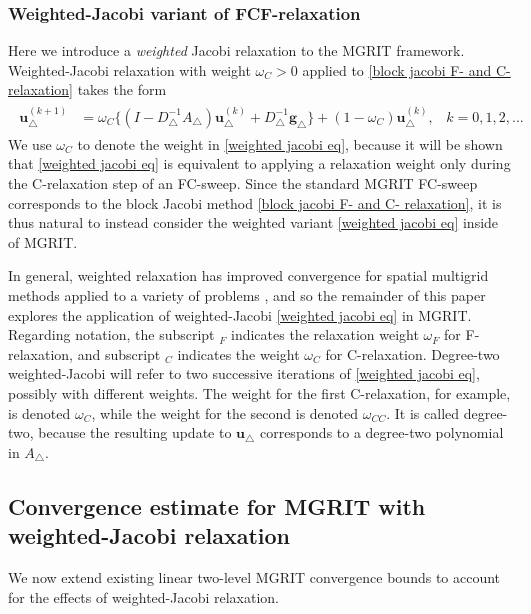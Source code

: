 \documentclass[VANCOUVER,STIX1COL]{WileyNJD-v2}
\begin{document}
\subsubsection{Weighted-Jacobi variant of FCF-relaxation}
Here we introduce a \emph{weighted} Jacobi relaxation to the MGRIT framework. Weighted-Jacobi relaxation with weight $\omega_C > 0$ applied to \eqref{block jacobi F- and C- relaxation} takes the form
\begin{align}  \label{weighted jacobi eq}
\begin{split}
\mathbf{u}_\triangle^{(k + 1)} &= \omega_C \{(I - D_\triangle^{-1}A_\triangle) \mathbf{u}_\triangle^{(k)} + D_\triangle^{-1} \mathbf{g}_\triangle\} + (1 - \omega_C) \mathbf{u}_\triangle^{(k)}, \hspace{10pt} k = 0,1,2,... 
\end{split}
\end{align}
We use $\omega_C$ to denote the weight in \eqref{weighted jacobi eq}, because it will be shown that \eqref{weighted jacobi eq} is equivalent to applying a relaxation weight only during the C-relaxation step of an FC-sweep. Since the standard MGRIT FC-sweep corresponds to the block Jacobi method \eqref{block jacobi F- and C- relaxation}, it
is thus natural to instead consider the weighted variant \eqref{weighted jacobi eq} inside of MGRIT.  

In general, weighted relaxation has improved convergence for spatial multigrid methods applied to a variety of problems {\cite{AdBrHuTu2003,BaFaKoYa2011,TrOo2001,BrHeMc2000}}, and so the remainder of this paper explores the application of weighted-Jacobi \eqref{weighted jacobi eq} in MGRIT.
Regarding notation, the subscript $_F$ indicates the relaxation weight $\omega_F$ for F-relaxation, and subscript $_C$ indicates the weight $\omega_C$ for C-relaxation. Degree-two weighted-Jacobi will refer to two successive iterations of \eqref{weighted jacobi eq}, possibly with different weights.  The weight for the first C-relaxation{, for example,} is denoted $\omega_C$, while the weight for the second is denoted $\omega_{CC}$.
It is called degree-two, because the resulting update to
$\mathbf{u}_\triangle$ corresponds to a degree-two polynomial in $A_\triangle$.


\subsection{Convergence estimate for MGRIT with weighted-Jacobi relaxation}

We now extend existing linear two-level MGRIT convergence bounds \cite{Do2016,So2019} to account for the effects of weighted-Jacobi relaxation. 
\end{document}
